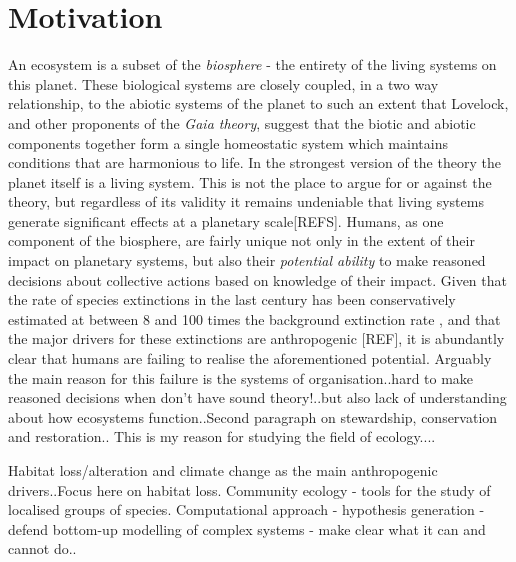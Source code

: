 

\section{Motivation}
\label{sec:intro_motivation}

An ecosystem is a subset of the \emph{biosphere} - the entirety of the living systems on this planet. These biological systems are closely coupled, in a two way relationship, to the abiotic systems of the planet to such an extent that Lovelock, and other proponents of the \emph{Gaia theory}, suggest that the biotic and abiotic components together form a single homeostatic system which maintains conditions that are harmonious to life. In the strongest version of the theory the planet itself is a living system. This is not the place to argue for or against the theory, but regardless of its validity it remains undeniable that living systems generate significant effects at a planetary scale[REFS]. Humans, as one component of the biosphere, are fairly unique not only in the extent of their impact on planetary systems, but also their \emph{potential ability} to make reasoned decisions about collective actions based on knowledge of their impact. Given that the rate of species extinctions in the last century has been conservatively estimated at between 8 and 100 times the background extinction rate  \cite{ceballos2015accelerated}, and that the major drivers for these extinctions are anthropogenic [REF], it is abundantly clear that humans are failing to realise the aforementioned potential. Arguably the main reason for this failure is the systems of organisation..hard to make reasoned decisions when don't have sound theory!..but also lack of understanding about how ecosystems function..Second paragraph on stewardship, conservation and restoration..  This is my reason for studying the field of ecology....

Habitat loss/alteration and climate change as the main anthropogenic drivers..Focus here on habitat loss. Community ecology - tools for the study of localised groups of species. Computational approach - hypothesis generation - defend bottom-up modelling of complex systems - make clear what it can and cannot do..

